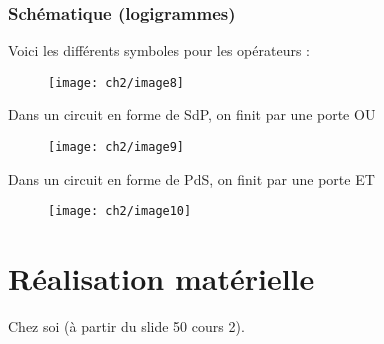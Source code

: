 \subsubsection{Schématique (logigrammes)}
Voici les différents symboles pour les opérateurs :
\begin{figure}[H]
	\centering
	\texttt{[image: ch2/image8]}
\end{figure}
Dans un circuit en forme de SdP, on finit par une porte OU
\begin{figure}[H]
	\centering
	\texttt{[image: ch2/image9]}
\end{figure}
Dans un circuit en forme de PdS, on finit par une porte ET
\begin{figure}[H]
	\centering
	\texttt{[image: ch2/image10]}
\end{figure}
\section{Réalisation matérielle}
Chez soi (à partir du slide 50 cours 2).